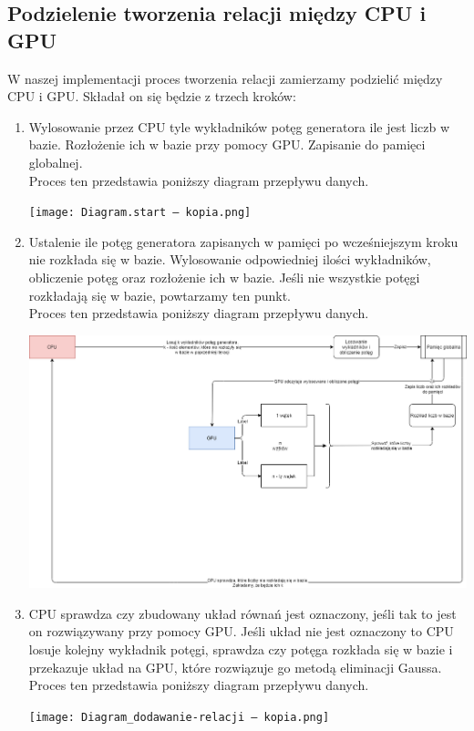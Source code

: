 \documentclass{article}
\begin{document}
\subsection{Podzielenie tworzenia relacji między CPU i GPU}
W naszej implementacji proces tworzenia relacji zamierzamy podzielić między CPU i GPU. Składał on się będzie z trzech kroków:
\begin{enumerate}
    \item Wylosowanie przez CPU tyle wykładników potęg generatora ile jest liczb w bazie. Rozłożenie ich w bazie przy pomocy GPU. Zapisanie do pamięci globalnej.\\
    Proces ten przedstawia poniższy diagram przepływu danych.
    \begin{center}
    \texttt{[image: Diagram.start — kopia.png]}
    \end{center}
    \item Ustalenie ile potęg generatora zapisanych w pamięci po wcześniejszym kroku nie rozkłada się w bazie. Wylosowanie odpowiedniej ilości wykładników, obliczenie potęg oraz rozłożenie ich w bazie. Jeśli nie wszystkie potęgi rozkładają się w bazie, powtarzamy ten punkt.\\
    Proces ten przedstawia poniższy diagram przepływu danych.
    \begin{center}
    \includegraphics[width = 15 cm]{Diagram_uzupełnienie_do_n — kopia.png}
    \end{center}
    \newpage
    \item CPU sprawdza czy zbudowany układ równań jest oznaczony, jeśli tak to jest on rozwiązywany przy pomocy GPU. Jeśli układ nie jest oznaczony to CPU losuje kolejny wykładnik potęgi, sprawdza czy potęga rozkłada się w bazie i przekazuje układ na GPU, które rozwiązuje go metodą eliminacji Gaussa.\\
    Proces ten przedstawia poniższy diagram przepływu danych.
    \begin{center}
    \texttt{[image: Diagram\_dodawanie-relacji — kopia.png]}
    \end{center}
\end{enumerate}
\newpage
\end{document}
